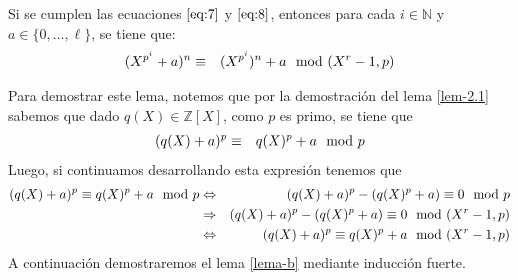 	\begin{lemma}\label{lema-b}
		Si se cumplen las ecuaciones $\eqref{eq:7}$ y $\eqref{eq:8}$, entonces para cada $i\in\mathbb{N}$ y $a \in \{0, \ldots, \ell\}$, se tiene que:
		\begin{eqnarray*}
			(X^{p^i}+a)^n&\equiv &(X^{p^i})^n + a \mod (X^r-1,p)
		\end{eqnarray*}
	\end{lemma} 
        Para demostrar este lema, notemos que por la demostración del lema \ref{lem-2.1} sabemos que dado $q(X)\in \mathbb{Z}[X]$, como $p$ es primo, se tiene que 
		\begin{eqnarray*}
			(q(X)+a)^p&\equiv &q(X)^p + a \mod p
		\end{eqnarray*}
		Luego, si continuamos desarrollando esta expresión tenemos que
		\begin{eqnarray}
			(q(X)+a)^p\equiv q(X)^p + a \mod p\nonumber & \Leftrightarrow & (q(X)+a)^p - (q(X)^p + a)\equiv 0 \mod p\nonumber\\
			& \Rightarrow & (q(X)+a)^p - (q(X)^p + a)\equiv 0 \mod (X^r-1,p)\nonumber\\
			& \Leftrightarrow & (q(X)+a)^p\equiv q(X)^p+a \mod (X^r-1,p)\label{eq:corolario2.1}
		\end{eqnarray}
	A continuación demostraremos el lema \ref{lema-b} mediante inducción fuerte.
